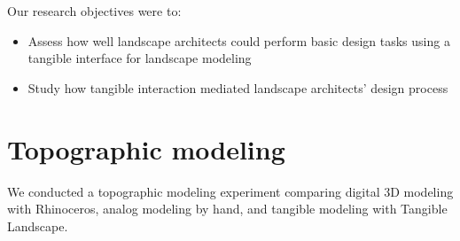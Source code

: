 \documentclass[Afour,sageh,times]{sagej}
\begin{document}
Our research objectives were to:
%
\begin{itemize}
\item Assess how well landscape architects could perform basic design tasks using
a tangible interface for landscape modeling
\item Study how tangible interaction mediated
landscape architects' design process
\end{itemize}

\clearpage


\section{Topographic modeling}



We conducted a topographic modeling experiment 
comparing 
digital 3D modeling with Rhinoceros, 
analog modeling by hand, 
and tangible modeling with Tangible Landscape. 

%
\end{document}
